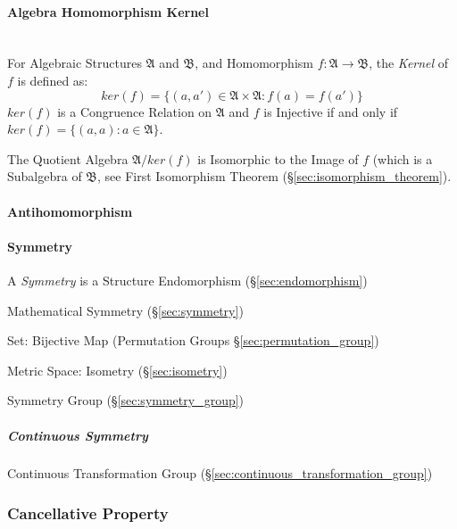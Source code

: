 \paragraph{Algebra Homomorphism Kernel}\hfill
\label{sec:algebra_homomorphism_kernel} \hfill \\

For Algebraic Structures $\mathfrak{A}$ and $\mathfrak{B}$, and
Homomorphism $f: \mathfrak{A} \rightarrow \mathfrak{B}$, the
\emph{Kernel} of $f$ is defined as:
\[
    ker(f) = \{ (a,a') \in \mathfrak{A} \times \mathfrak{A} : f(a) = f(a') \}
\]
$ker(f)$ is a Congruence Relation on $\mathfrak{A}$ and $f$ is Injective if and
only if $ker(f) = \{(a,a) : a \in \mathfrak{A}\}$.

The Quotient Algebra $\mathfrak{A}/ker(f)$ is Isomorphic to the Image
of $f$ (which is a Subalgebra of $\mathfrak{B}$, see First Isomorphism
Theorem (\S\ref{sec:isomorphism_theorem}).



\paragraph{Antihomomorphism}\label{sec:antihomomorphism}\hfill

\paragraph{Symmetry}\label{sec:structure_symmetry}\hfill

A \emph{Symmetry} is a Structure Endomorphism
(\S\ref{sec:endomorphism})

Mathematical Symmetry (\S\ref{sec:symmetry})

Set: Bijective Map (Permutation Groups \S\ref{sec:permutation_group})

Metric Space: Isometry (\S\ref{sec:isometry})

Symmetry Group (\S\ref{sec:symmetry_group})



\subparagraph{Continuous Symmetry}\label{sec:continuous_symmetry}\hfill

Continuous Transformation Group
(\S\ref{sec:continuous_transformation_group})



\subsubsection{Cancellative Property}\label{sec:cancellative_property}


